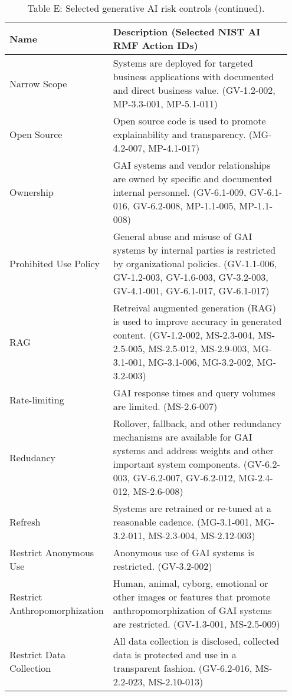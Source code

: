 \documentclass[fleqn]{article}
\begin{document}
\begin{table}[H]
	\caption*{Table E: Selected generative AI risk controls (continued).}
	\label{tab:controls_cont2}
	\footnotesize
	\begin{tabular}{|m{0.25\linewidth} |m{0.70\linewidth} |}
		\hline
		\textbf{Name} & \textbf{Description} (Selected NIST AI RMF Action IDs)\\
		\hline		
		Narrow Scope & Systems are deployed for targeted business applications with documented and direct business value. (GV-1.2-002, MP-3.3-001, MP-5.1-011) \\ \hline
		Open Source & Open source code is used to promote explainability and transparency. (MG-4.2-007, MP-4.1-017) \\ 
		\hline
		Ownership & GAI systems and vendor relationships are owned by specific and documented internal personnel. (GV-6.1-009, GV-6.1-016, GV-6.2-008, MP-1.1-005, MP-1.1-008) \\ \hline
		Prohibited Use Policy & General abuse and misuse of GAI systems by internal parties is restricted by organizational policies. (GV-1.1-006, GV-1.2-003, GV-1.6-003, GV-3.2-003, GV-4.1-001, GV-6.1-017, GV-6.1-017) \\ 
		\hline
		RAG & Retreival augmented generation (RAG) is used to improve accuracy in generated content. (GV-1.2-002, MS-2.3-004, MS-2.5-005, MS-2.5-012, MS-2.9-003, MG-3.1-001, MG-3.1-006, MG-3.2-002, MG-3.2-003)  \\ \hline
		Rate-limiting  & GAI response times and query volumes are limited. (MS-2.6-007) \\ 
		\hline
		Redudancy & Rollover, fallback, and other redundancy mechanisms are available for GAI systems and address weights and other important system components. (GV-6.2-003, GV-6.2-007, GV-6.2-012, MG-2.4-012, MS-2.6-008)   \\ 
		\hline
		Refresh & Systems are retrained or re-tuned at a reasonable cadence. (MG-3.1-001, MG-3.2-011, MS-2.3-004, MS-2.12-003)  \\ 
		\hline
		Restrict Anonymous Use & Anonymous use of GAI systems is restricted. (GV-3.2-002)  \\ 
		\hline
		Restrict Anthropomorphization  & Human, animal, cyborg, emotional or other images or features that promote anthropomorphization of GAI systems are restricted. (GV-1.3-001, MS-2.5-009)   \\ 
		\hline
		Restrict Data Collection & All data collection is disclosed, collected data is protected and use in a transparent fashion. (GV-6.2-016,  MS-2.2-023, MS-2.10-013) \\ 

\end{tabular}
\end{table}
\end{document}
